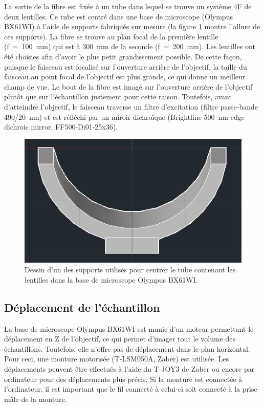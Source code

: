 \documentclass{article}       %
\begin{document}
La sortie de la fibre est fixée à un tube dans lequel se trouve un système 4F de deux lentilles. Ce tube est centré dans une base de microscope (Olympus BX61WI) à l'aide de supports fabriqués sur mesure (la figure \ref{Fig:Support} montre l'allure de ces supports). La fibre se trouve au plan focal de la première lentille (f~=~100~mm) qui est à 300~mm de la seconde (f~=~200~mm). Les lentilles ont été choisies afin d'avoir le plus petit grandissement possible. De cette façon, puisque le faisceau est focalisé sur l'ouverture arrière de l'objectif, la taille du faisceau au point focal de l'objectif est plus grande, ce qui donne un meilleur champ de vue. Le bout de la fibre est imagé sur l'ouverture arrière de l'objectif plutôt que sur l'échantillon justement pour cette raison. Toutefois, avant d'atteindre l'objectif, le faisceau traverse un filtre d'excitation (filtre passe-bande 490/20~nm) et est réfléchi par un miroir dichroïque (Brightline 500~nm edge dichroic mirror, FF500-Di01-25x36).

\begin{figure}[H]
    \centering
    \includegraphics[scale=0.75]{fig/Support.PNG}
    \caption{Dessin d'un des supports utilisés pour centrer le tube contenant les lentilles dans la base de microscope Olympus BX61WI.}
    \label{Fig:Support}
\end{figure}


\subsection{Déplacement de l'échantillon}

La base de microscope Olympus BX61WI est munie d'un moteur permettant le déplacement en Z de l'objectif, ce qui permet d'imager tout le volume des échantillons. Toutefois, elle n'offre pas de déplacement dans le plan horizontal. Pour ceci, une monture motorisée (T-LSM050A, Zaber) est utilisée. Les déplacements peuvent être effectués à l'aide du T-JOY3 de Zaber ou encore par ordinateur pour des déplacements plus précis. Si la monture est connectée à l'ordinateur, il est important que le fil connecté à celui-ci soit connecté à la prise mâle de la monture.
\end{document}
